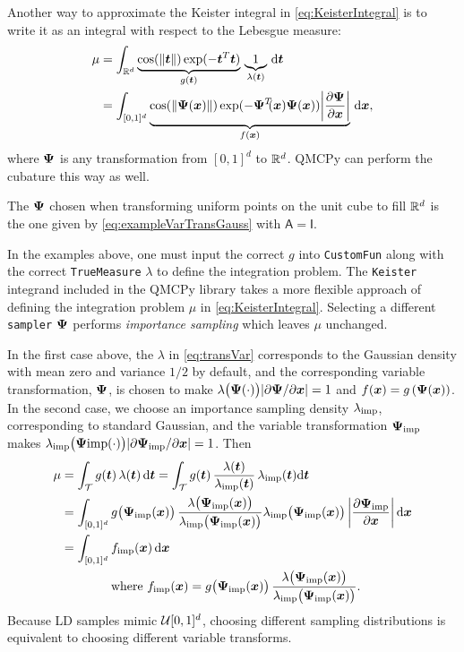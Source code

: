 \documentclass[graybox,footinfo]{svmult}
\newcommand{\QMCPYabs}[1]{\ensuremath{{\left \lvert #1 \right \rvert}}}
\newcommand{\IMP}{\textup{imp}}
\newcommand{\mA}{\mathsf{A}}
\newcommand{\mI}{\mathsf{I}}
\newcommand{\cube}{[0,1]^d}
\begin{document}
Another way to approximate the Keister integral in \eqref{eq:KeisterIntegral} is to write it as an integral with respect to the Lebesgue measure:
\begin{align*} 
	\mu 
	& = \int_{\bbR^d} \underbrace{\cos(\lVert \bst \rVert) \exp(-\bst^T \bst) }_{g(\bst)} \, \underbrace{1}_{\lambda(\bst)} \,\D \bst \\
	& = \int_{[0,1]^d} \underbrace{\cos(\lVert \bsPsi(\bsx) \rVert) \exp(-\bsPsi^T\!\!(\bsx) \bsPsi(\bsx)) \QMCPYabs{\frac{\partial \bsPsi}{\partial \bsx}} }_{f(\bsx)} \, \D \bsx,
\end{align*}
where ${\boldsymbol{\Psi}}$ is any transformation from $[0,1]^d$ to ${\mathbb{R}}^d$.  QMCPy can perform the cubature this way as well.

The ${\boldsymbol{\Psi}}$ chosen when transforming uniform points on the unit cube to fill ${\mathbb{R}}^d$ is the one given by \eqref{eq:exampleVarTransGauss} with $\mA = \mI$.

In the examples above, one must input the correct $g$ into \texttt{CustomFun} along with the correct \texttt{TrueMeasure} $\lambda$ to define the integration problem. The \texttt{Keister} integrand included in the QMCPy library takes a more flexible approach of defining the integration problem $\mu$ in \eqref{eq:KeisterIntegral}. Selecting a different \texttt{sampler} ${\boldsymbol{\Psi}}$ performs  \emph{importance sampling} which leaves $\mu$ unchanged.  


In the first case above, the $\lambda$ in \eqref{eq:transVar} corresponds to the Gaussian density  with mean zero and variance $1/2$ by default, and the corresponding variable transformation, ${\boldsymbol{\Psi}}$, is chosen to make $\lambda\bigl(\bsPsi(\cdot)\bigr) \QMCPYabs{\partial \bsPsi/\partial \bsx} = 1$ and $f({\boldsymbol{x}}) = g\left({\boldsymbol{\Psi}}({\boldsymbol{x}}) \right)$.  In the second case,  we choose an importance sampling density $\lambda_{\IMP}$, corresponding  to standard  Gaussian, and the variable transformation $\bsPsi_{\IMP}$ makes $\lambda_\IMP\bigl(\bsPsi\IMP(\cdot)\bigr) \QMCPYabs{\partial \bsPsi_\IMP/\partial \bsx} = 1$.  Then
\begin{align}
	\nonumber 
	\mu &= \int_\calT g(\bst) \, \lambda(\bst) \, \D \bst  = \int_\calT g(\bst) \, \frac{\lambda(\bst)}{\lambda_\IMP(\bst) } \, \lambda_\IMP(\bst) \D \bst  \\ 
	\nonumber
	& =  \int_{\cube} g\bigl(\bsPsi_\IMP(\bsx)\bigr) \, \frac{\lambda\bigl(\bsPsi_\IMP(\bsx)\bigr)} {\lambda_\IMP\bigl(\bsPsi_\IMP(\bsx)\bigr) } \lambda_\IMP\bigl(\bsPsi_\IMP(\bsx)\bigr) \,\QMCPYabs{\frac{\partial \bsPsi_\IMP}{\partial \bsx}} \, \D \bsx \\
	\nonumber
	& =  \int_{\cube} f_\IMP(\bsx) \, \D \bsx  \\
	\label{eq:transVarImp}
	& \qquad \qquad \text{where } f_\IMP(\bsx)  = g\bigl(\bsPsi_\IMP(\bsx)\bigr)  \,  \frac{\lambda\bigl(\bsPsi_\IMP(\bsx)\bigr)} {\lambda_\IMP\bigl(\bsPsi_\IMP(\bsx)\bigr) }.
\end{align}
Because LD samples mimic $\calU\cube$, choosing different sampling distributions is equivalent to choosing different variable transforms.
\end{document}
